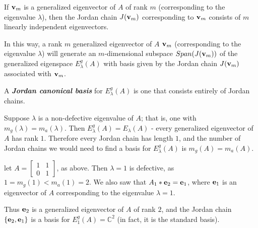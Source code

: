 \documentclass{ximera}
\begin{document}
\begin{theorem} If ${\bf v}_m$ is a generalized eigenvector of $A$ of rank $m$ (corresponding to the eigenvalue $\lambda$), then the Jordan chain $J({\bf v}_m)$ corresponding to ${\bf v}_m$ consists of $m$ linearly independent eigenvectors.
\end{theorem}

In this way, a rank $m$ generalized eigenvector of $A$ ${\bf v}_m$ (corresponding to the eigenvalue $\lambda$) will generate an $m$-dimensional subspace $Span(J({\bf v}_m))$ of the generalized eigenspace $E^g_\lambda(A)$ with basis given by the Jordan chain $J({\bf v}_m)$ associated with ${\bf v}_m$.

\begin{definition} A \textbf{\textit{Jordan canonical basis}} for $E^g_\lambda(A)$ is one that consists entirely of Jordan chains.
\end{definition}

\begin{example} Suppose $\lambda$ is a non-defective eigenvalue of $A$; that is, one with $m_g(\lambda) = m_a(\lambda)$. Then $E^g_\lambda(A) = E_\lambda(A)$ - every generalized eigenvector of $A$ has rank $1$. Therefore every Jordan chain has length $1$, and the number of Jordan chains we would need to find a basis for $E^g_\lambda(A)$ is $m_g(A) = m_a(A)$.
\end{example}

\begin{example} let $A = \begin{bmatrix} 1 & 1\\0 & 1\end{bmatrix}$, as above. Then $\lambda = 1$ is defective, as $1 = m_g(1) < m_a(1) = 2$. We also saw that $A_1*{\bf e}_2 = {\bf e}_1$, where ${\bf e}_1$ is an eigenvector of $A$ corresponding to the eigenvalue $\lambda = 1$.

Thus ${\bf e}_2$ is a generalized eigenvector of $A$ of rank $2$, and the Jordan chain $\{{\bf e}_2, {\bf e}_1\}$ is a basis for $E^g_1(A) = \mathbb C^2$ (in fact, it is the standard basis).
\end{example}
\end{document}
